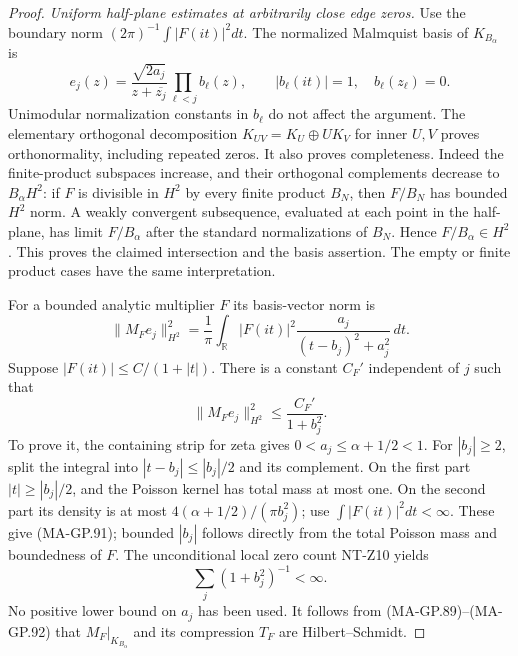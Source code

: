 \begin{proof}
\emph{Uniform half-plane estimates at arbitrarily close edge zeros.}
Use the boundary norm $(2\pi)^{-1}\int|F(it)|^2dt$.
The normalized Malmquist basis of $K_{B_\alpha}$ is
\[
 e_j(z)=\frac{\sqrt{2a_j}}{z+\overline{z_j}}
                         \prod_{\ell<j} b_\ell(z),
 \qquad |b_\ell(it)|=1,\quad b_\ell(z_\ell)=0.
 \tag{MA-GP.89}
\]
Unimodular normalization constants in $b_\ell$ do not affect
the argument.  The elementary orthogonal decomposition
$K_{UV}=K_U\oplus U K_V$ for inner $U,V$ proves orthonormality,
including repeated zeros.  It also proves completeness.
Indeed the finite-product subspaces increase, and their
orthogonal complements decrease to $B_\alpha H^2$:
if $F$ is divisible in $H^2$ by every finite product $B_N$,
then $F/B_N$ has bounded $H^2$ norm.  A weakly convergent
subsequence, evaluated at each point in the half-plane,
has limit $F/B_\alpha$ after the standard normalizations
of $B_N$.  Hence $F/B_\alpha\in H^2$.
This proves the claimed intersection and the basis assertion.
The empty or finite product cases have the same interpretation.

For a bounded analytic multiplier $F$ its basis-vector norm is
\[
 \|M_F e_j\|_{H^2}^2
   =\frac1\pi\int_{\mathbb R}
         |F(it)|^2\frac{a_j}{(t-b_j)^2+a_j^2}\,dt .
 \tag{MA-GP.90}
\]
Suppose $|F(it)|\le C/(1+|t|)$.
There is a constant $C_F'$ independent of $j$ such that
\[
                   \|M_F e_j\|_{H^2}^2
                              \le\frac{C_F'}{1+b_j^2}.
 \tag{MA-GP.91}
\]
To prove it, the containing strip for zeta gives
$0<a_j\le\alpha+1/2<1$.
For $|b_j|\ge2$, split the integral into
$|t-b_j|\le|b_j|/2$ and its complement.
On the first part $|t|\ge|b_j|/2$, and the Poisson
kernel has total mass at most one.
On the second part its density is at most
$4(\alpha+1/2)/(\pi b_j^2)$; use
$\int|F(it)|^2dt<\infty$.
These give (MA-GP.91); bounded $|b_j|$ follows directly
from the total Poisson mass and boundedness of $F$.
The unconditional local zero count NT-Z10 yields
\[
                      \sum_j(1+b_j^2)^{-1}<\infty.
 \tag{MA-GP.92}
\]
No positive lower bound on $a_j$ has been used.
It follows from (MA-GP.89)--(MA-GP.92) that
$M_F|_{K_{B_\alpha}}$ and its compression $T_F$ are
Hilbert--Schmidt.


\end{proof}
